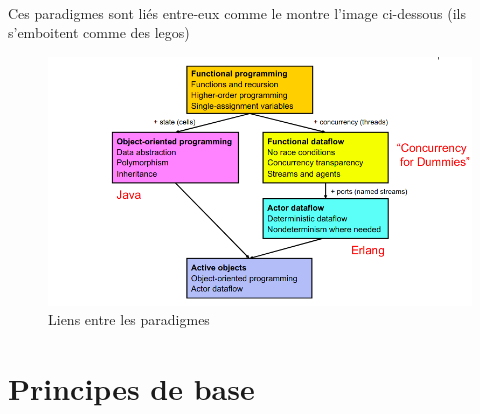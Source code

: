       \paragraph{} Ces paradigmes sont liés entre-eux comme le montre l'image ci-dessous (ils s'emboitent comme des 
      legos)

      \begin{figure}[H]
        \centering
        \includegraphics[width=\textwidth]{pictures/chapter1/five-paradigms.png}
        \caption{Liens entre les paradigmes}
      \end{figure}

      \section{Principes de base}

